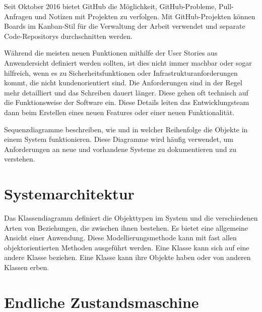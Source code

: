 Seit Oktober 2016 bietet GitHub die Möglichkeit, GitHub-Probleme, Pull-Anfragen und Notizen mit Projekten zu verfolgen. Mit GitHub-Projekten können Boards im Kanban-Stil für die Verwaltung der Arbeit verwendet und separate Code-Repositorys durchschnitten werden. 


Während die meisten neuen Funktionen mithilfe der User Stories aus Anwendersicht definiert werden sollten, ist dies nicht immer machbar oder sogar hilfreich, wenn es zu Sicherheitsfunktionen oder Infrastrukturanforderungen kommt, die nicht kundenorientiert sind. Die Anforderungen sind in der Regel mehr detailliert und das Schreiben dauert länger. Diese gehen oft technisch auf die Funktionsweise der Software ein. Diese Details leiten das Entwicklungsteam dann beim Erstellen eines neuen Features oder einer neuen Funktionalität.

Sequenzdiagramme beschreiben, wie und in welcher Reihenfolge die Objekte in einem System funktionieren. Diese Diagramme wird häufig verwendet, um Anforderungen an neue und vorhandene Systeme zu dokumentieren und zu verstehen.

\section{Systemarchitektur}
\label{sec:design:arch}
Das Klassendiagramm definiert die Objekttypen im System und die verschiedenen Arten von Beziehungen, die zwischen ihnen bestehen. Es bietet eine allgemeine Ansicht einer Anwendung. Diese Modellierungsmethode kann mit fast allen objektorientierten Methoden ausgeführt werden. Eine Klasse kann sich auf eine andere Klasse beziehen. Eine Klasse kann ihre Objekte haben oder von anderen Klassen erben.

\section{Endliche Zustandsmaschine}
\label{sec:design:fsm}
